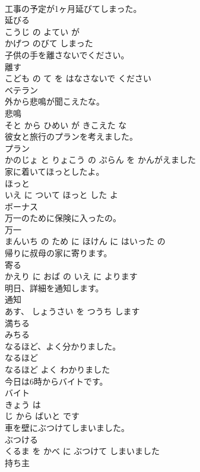 \documentclass[8pt]{extreport}
\begin{document}
\begin{CJK}{UTF8}{min}
\\	工事の予定が1ヶ月延びてしまった。	
\\	延びる 
\\	こうじ の よてい が 
\\	かげつ のびて しまった			
\\	子供の手を離さないでください。	
\\	離す 
\\	こども の て を はなさないで ください			
\\	ベテラン	
\\	外から悲鳴が聞こえたな。	
\\	悲鳴 
\\	そと から ひめい が きこえた な			
\\	彼女と旅行のプランを考えました。	
\\	プラン 
\\	かのじょ と りょこう の ぷらん を かんがえました			
\\	家に着いてほっとしたよ。	
\\	ほっと 
\\	いえ に ついて ほっと した よ			
\\	ボーナス	
\\	万一のために保険に入ったの。	
\\	万一 
\\	まんいち の ため に ほけん に はいった の			
\\	帰りに叔母の家に寄ります。	
\\	寄る 
\\	かえり に おば の いえ に よります			
\\	明日、詳細を通知します。	
\\	通知 
\\	あす、 しょうさい を つうち します			
\\	満ちる	
\\	みちる		
\\	なるほど、よく分かりました。	
\\	なるほど 
\\	なるほど よく わかりました			
\\	今日は6時からバイトです。	
\\	バイト 
\\	きょう は 
\\	じ から ばいと です			
\\	車を壁にぶつけてしまいました。	
\\	ぶつける 
\\	くるま を かべ に ぶつけて しまいました			
\\	持ち主	

\end{CJK}
\end{document}
